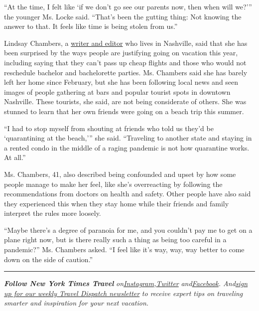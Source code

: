 ``At the time, I felt like `if we don't go see our parents now, then
when will we?''' the younger Ms. Locke said. ``That's been the gutting
thing: Not knowing the answer to that. It feels like time is being
stolen from us.''

Lindsay Chambers, a \href{https://www.editingskills.com/}{writer and
editor} who lives in Nashville, said that she has been surprised by the
ways people are justifying going on vacation this year, including saying
that they can't pass up cheap flights and those who would not reschedule
bachelor and bachelorette parties. Ms. Chambers said she has barely left
her home since February, but she has been following local news and seen
images of people gathering at bars and popular tourist spots in downtown
Nashville. These tourists, she said, are not being considerate of
others. She was stunned to learn that her own friends were going on a
beach trip this summer.

``I had to stop myself from shouting at friends who told us they'd be
`quarantining at the beach,''' she said. ``Traveling to another state
and staying in a rented condo in the middle of a raging pandemic is not
how quarantine works. At all.''

Ms. Chambers, 41, also described being confounded and upset by how some
people manage to make her feel, like she's overreacting by following the
recommendations from doctors on health and safety. Other people have
also said they experienced this when they stay home while their friends
and family interpret the rules more loosely.

``Maybe there's a degree of paranoia for me, and you couldn't pay me to
get on a plane right now, but is there really such a thing as being too
careful in a pandemic?'' Ms. Chambers asked. ``I feel like it's way,
way, way better to come down on the side of caution.''

\begin{center}\rule{0.5\linewidth}{\linethickness}\end{center}

\emph{\textbf{Follow New York Times Travel}}
\emph{on}\href{https://www.instagram.com/nytimestravel/}{\emph{Instagram}}\emph{,}\href{https://twitter.com/nytimestravel}{\emph{Twitter}}
\emph{and}\href{https://www.facebookcorewwwi.onion/nytimestravel/}{\emph{Facebook}}\emph{.
And}\href{https://www.nytimes3xbfgragh.onion/newsletters/traveldispatch}{\emph{sign
up for our weekly Travel Dispatch newsletter}} \emph{to receive expert
tips on traveling smarter and inspiration for your next vacation.}

